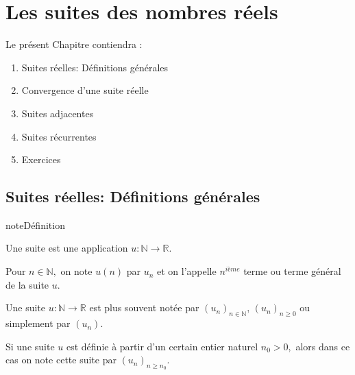 \documentclass[letterpaper,10pt,french]{jupyterBook}
\begin{document}
\chapter{Les suites des nombres réels}
\label{\detokenize{suite:les-suites-des-nombres-reels}}\label{\detokenize{suite::doc}}
\sphinxAtStartPar
Le présent Chapitre contiendra :
\begin{enumerate}
%
\item {} 
\sphinxAtStartPar
Suites réelles: Définitions générales

\item {} 
\sphinxAtStartPar
Convergence d’une suite réelle

\item {} 
\sphinxAtStartPar
Suites adjacentes

\item {} 
\sphinxAtStartPar
Suites récurrentes

\item {} 
\sphinxAtStartPar
Exercices

\end{enumerate}


\section{Suites réelles: Définitions générales}
\label{\detokenize{suites:suites-reelles-definitions-generales}}\label{\detokenize{suites::doc}}
\begin{sphinxadmonition}{note}{Définition}

\sphinxAtStartPar
Une suite est une application \(u:\mathbb{N}\rightarrow\mathbb{R}.\)

\sphinxAtStartPar
Pour \(n\in \mathbb{N},\) on note \(u(n)\) par \(u_n\) et on l’appelle \(n^{ième}\) terme ou terme général de la suite \(u.\)
\end{sphinxadmonition}

\sphinxAtStartPar
Une suite \(u:\mathbb{N}\rightarrow\mathbb{R}\) est plus souvent notée par \((u_n)_{n\in \mathbb{N}},\,(u_n)_{n\geq0}\) ou simplement par \((u_n).\)

\sphinxAtStartPar
Si une suite \(u\) est définie à partir d’un certain entier naturel \(n_0>0,\) alors dans ce cas on note cette suite par \((u_n)_{n\geq n_0}.\)
\end{document}
